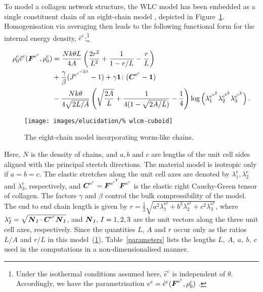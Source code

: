 To model a collagen network structure, the WLC model has been embedded
as a single constituent chain of an eight-chain model
\citep{Bischoffetal:2002, Bischoffetal1:2002}, depicted in
\mbox{Figure~\ref{eight-chain-model}}.  Homogenisation via averaging
then leads to the following functional form for the internal energy
density, $\hat{e}^\mathrm{c}$:\footnote{Under the isothermal
  conditions assumed here, $\hat{e}^\mathrm{c}$ is independent of
  $\theta$. Accordingly, we have the parametrisation
  ${e}^\mathrm{c}=\hat{e}^\mathrm{c}
  (\mbox{\boldmath$ F$}^{\mathrm{e}^\mathrm{c}},\rho^\mathrm{c}_{0})$ .}

\begin{equation}
\begin{split}
\rho^\mathrm{c}_{0}\hat{e}^\mathrm{c}
(\mbox{\boldmath$ F$}^{\mathrm{e}^\mathrm{c}},\rho^\mathrm{c}_{0}) &= \frac{N k
  \theta L}{4 A}\left(\frac{2 r^2}{L^2} + \frac{1}{1-r/L} -
\frac{r}{L}\right)\\ & +
\frac{\gamma}{\beta}({J^{\mathrm{e}^{\mathrm{c}^{-2\beta}}}} -1) +
\gamma{\bf 1}\colon(\mbox{\boldmath$ C$}^{\mathrm{e}^{\mathrm{c}}}-{\bf 1})\\ &-\frac{N
  k \theta}{4\sqrt{2L/A}}\left(\sqrt{\frac{2A}{L}} + \frac{1}{4(1 -
  \sqrt{2A/L})} -\frac{1}{4} \right)
\log\left(\lambda_1^{{\mathrm{e}}^{a^\mathrm{2}}}
\lambda_2^{{\mathrm{e}}^{b^\mathrm{2}}}
\lambda_3^{{\mathrm{e}}^{c^\mathrm{2}}}\right).
\label{wlcm-energy}
\end{split}
\end{equation}

\begin{figure}
  \centering {}  
    
   
  \texttt{[image: images/elucidation/\%
    wlcm-cuboid]}
  \caption{The eight-chain model incorporating worm-like chains.}
  \label{eight-chain-model}
\end{figure}

Here, $N$ is the density of chains, and $a,b$ and $c$ are lengths of
the unit cell sides aligned with the principal stretch directions. The
material model is isotropic only if $a=b=c$. The elastic stretches
along the unit cell axes are denoted by $\lambda_1^{\mathrm{e}},
\lambda_2^{\mathrm{e}}$ and $\lambda_3^{\mathrm{e}}$, respectively,
and $\mbox{\boldmath$ C$}^{\mathrm{e}^{\mathrm{c}}} = \mbox{\boldmath$ F$}^{\mathrm{e} ^
  {\mathrm{c}^{\mathrm{T}}}} \mbox{\boldmath$ F$}^{\mathrm{e} ^ {\mathrm{c}}}$ is the
elastic right Cauchy-Green tensor of collagen. The factors $\gamma$
and $\beta$ control the bulk compressibility of the model. The end to
end chain length is given by $r = \frac{1}{2} \sqrt{a^2
  \lambda_1^{\mathrm{e}^2} + b^2\lambda_2^{\mathrm{e}^2} +
  c^2\lambda_3^{\mathrm{e}^2}}$, where $\lambda^\mathrm{e}_I =
\sqrt{\mbox{\boldmath$ N$}_I\cdot\mbox{\boldmath$ C$} ^ {\mathrm{e}^{\mathrm{c}}}\mbox{\boldmath$ N$}_I}$, and $\mbox{\boldmath$ N$}_I,\,I
= 1,2,3$ are the unit vectors along the three unit cell axes,
respectively. Since the quantities $L$, $A$ and $r$ occur only as the
ratios $L/A$ and $r/L$ in this model~(\ref{eight-chain-model}),
Table~\ref{parameters} lists the lengths $L,\ A,\ a,\ b,\ c$ used in
the computations in a non-dimensionalised manner.

